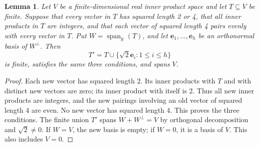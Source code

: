 \documentclass[11pt]{amsart}
\newcommand\re{{\mathbb R}}%
\newcommand\opk[1]{\mathop{\mathrm{#1}}\nolimits}
\newcommand\sbs{\subseteq}
\newtheorem{lemma}[theorem]{Lemma}
\theoremstyle{definition}
\newcommand{\Ze}{{\mathbf e}}
\begin{document}
\begin{lemma}\label{lem:seed-completion}
Let $V$ be a finite-dimensional real inner product space and let
$T\sbs V$ be finite. Suppose that every vector in $T$ has squared
length 2 or 4, that all inner products in $T$ are integers, and that
each vector of squared length 4 pairs evenly with every vector in $T$.
Put $W=\opk{span}_{\re}(T)$, and let $\Ze_1,\ldots,\Ze_h$ be an
orthonormal basis of $W^\perp$. Then
\[
 T'=T\cup\{\sqrt2\Ze_i:1\leq i\leq h\}
\]
is finite, satisfies the same three conditions, and spans $V$.
\end{lemma}
\begin{proof}
Each new vector has squared length 2. Its inner products with $T$
and with distinct new vectors are zero; its inner product with itself
is 2. Thus all new inner products are
integers, and the new pairings involving an old vector of squared length
4 are even. No new vector has squared length 4. This proves the three
conditions. The finite union $T'$ spans $W+W^\perp=V$ by orthogonal
decomposition and $\sqrt2\ne0$. If $W=V$, the new basis is empty;
if $W=0$, it is a basis of $V$. This also includes $V=0$.
\end{proof}
\end{document}
